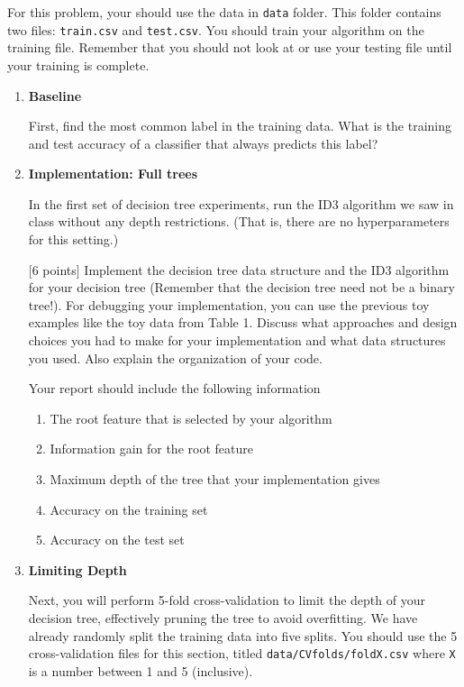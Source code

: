 For this problem, your should use the data in \texttt{data} folder. This folder
contains two files: \texttt{train.csv} and \texttt{test.csv}. You should train
your algorithm on the training file.  Remember that you should not look at or
use your testing file until your training is complete.

\begin{enumerate}

\item\relax [6 points] \textbf{Baseline}

  First, find the most common label in the training data. What is the training
  and test accuracy of a classifier that always predicts this label?

\item \textbf{Implementation: Full trees}
  \label{impl:full}

  In the first set of decision tree experiments, run the ID3 algorithm we saw in
  class without any depth restrictions. (That is, there are no hyperparameters
  for this setting.)

  [6 points] Implement the decision tree data structure and the ID3 algorithm
  for your decision tree (Remember that the decision tree need not be a binary
  tree!). For debugging your implementation, you can use the previous toy
  examples like the toy data from Table 1. Discuss what approaches and design
  choices you had to make for your implementation and what data structures you
  used.  Also explain the organization of your code.

  Your report should include the following information
  \begin{enumerate}
  \item \relax[2 points] The root feature that is selected by your algorithm
  \item \relax[2 point] Information gain for the root feature
  \item \relax[2 points] Maximum depth of the tree that your implementation
    gives
  \item \relax[3 points] Accuracy on the training set
  \item \relax[5 points] Accuracy on the test set
  \end{enumerate}
  
\item \textbf{Limiting Depth}
  \label{impl:limiting}

  Next, you will perform 5-fold cross-validation to limit the depth of your
  decision tree, effectively pruning the tree to avoid overfitting. We have
  already randomly split the training data into five splits.  You should use the
  5 cross-validation files for this section, titled
  \texttt{data/CVfolds/foldX.csv} where \texttt{X} is a number between 1 and 5
  (inclusive).


\end{enumerate}

